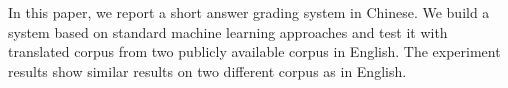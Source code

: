 In this paper, we report a short answer grading system in Chinese. We build a system based on standard machine learning approaches and test it with translated corpus from two publicly available corpus in English. The experiment results show similar results on two different corpus as in English.
